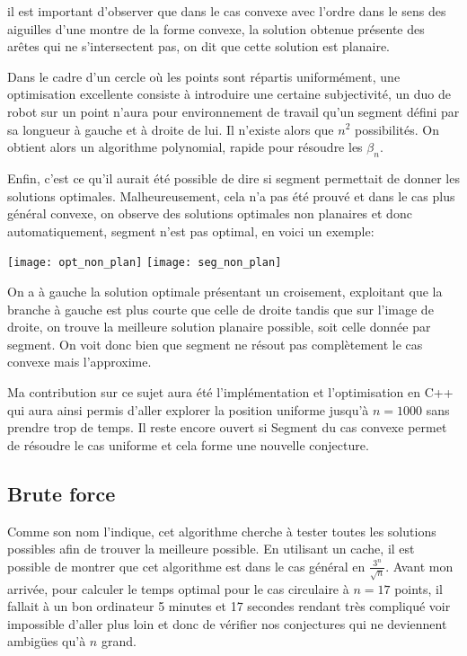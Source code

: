 il est important d'observer que dans le cas convexe avec l'ordre dans le sens des aiguilles d'une montre de la forme convexe, la solution obtenue présente des arêtes qui ne s'intersectent pas, on dit que cette solution est planaire. 

Dans le cadre d'un cercle où les points sont répartis uniformément, une optimisation excellente consiste à introduire une certaine subjectivité, un duo de robot sur un point n'aura pour environnement de travail qu'un segment défini par sa longueur à gauche et à droite de lui. Il n'existe alors que $n^2$ possibilités. On obtient alors un algorithme polynomial, rapide pour résoudre les $\beta_n$. 

Enfin, c'est ce qu'il aurait été possible de dire si segment permettait de donner les solutions optimales. Malheureusement, cela n'a pas été prouvé et dans le cas plus général convexe, on observe des solutions optimales non planaires et donc automatiquement, segment n'est pas optimal, en voici un exemple:

\texttt{[image: opt\_non\_plan]}
\texttt{[image: seg\_non\_plan]}

On a à gauche la solution optimale présentant un croisement, exploitant que la branche à gauche est plus courte que celle de droite tandis que sur l'image de droite, on trouve la meilleure solution planaire possible, soit celle donnée par segment. On voit donc bien que segment ne résout pas complètement le cas convexe mais l'approxime.

Ma contribution sur ce sujet aura été l'implémentation et l'optimisation en C++ qui aura ainsi permis d'aller explorer la position uniforme jusqu'à $n = 1000$ sans prendre trop de temps. Il reste encore ouvert si Segment du cas convexe permet de résoudre le cas uniforme et cela forme une nouvelle conjecture.

\subsection{Brute force}

Comme son nom l'indique, cet algorithme cherche à tester toutes les solutions possibles afin de trouver la meilleure possible. En utilisant un cache, il est possible de montrer que cet algorithme est dans le cas général en $\frac{3^n}{\sqrt{n}}$. Avant mon arrivée, pour calculer le temps optimal pour le cas circulaire à $n = 17$ points, il fallait à un bon ordinateur 5 minutes et 17 secondes rendant très compliqué voir impossible d'aller plus loin et donc de vérifier nos conjectures qui ne deviennent ambigües qu'à $n$ grand.

